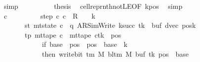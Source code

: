 \begin{isabellebody}
\ simp\isanewline
\ \ \ \ \ \ \ \ \isamarkupfalse%
\ {\isacharquery}{\kern0pt}thesis\ \isamarkupfalse%
\ cell{\isacharunderscore}{\kern0pt}repr{\isacharunderscore}{\kern0pt}nth{\isacharunderscore}{\kern0pt}not{\isacharunderscore}{\kern0pt}LE{}{\isacharbrackleft}{\kern0pt}OF\ kpos{\isacharbrackright}{\kern0pt}\ \isamarkupfalse%
\ simp\isanewline
\ \ \ \ \ \ \isamarkupfalse%
\isanewline
\ \ \ \ \isamarkupfalse%
\isanewline
\ \ \ \ \isamarkupfalse%
\ c{\isacharprime}{\kern0pt}{\isacharprime}{\kern0pt}\ \isanewline
\ \ \ \ \ \ \ \ step{\isacharcolon}{\kern0pt}\ {\isachardoublequoteopen}{\isacharparenleft}{\kern0pt}c{\isacharprime}{\kern0pt}{\isacharcomma}{\kern0pt}\ c{\isacharprime}{\kern0pt}{\isacharprime}{\kern0pt}{\isacharparenright}{\kern0pt}\ {\isasymin}\ {\isacharquery}{\kern0pt}R\ {\isacharcircum}{\kern0pt}{\isacharcircum}{\kern0pt}\ {\isacharparenleft}{\kern0pt}{}\ {\isacharasterisk}{\kern0pt}\ {\isacharquery}{\kern0pt}k{\isacharparenright}{\kern0pt}{\isachardoublequoteclose}\isanewline
\ \ \ \ \ \ \ st{\isacharcolon}{\kern0pt}\ {\isachardoublequoteopen}mt{\isacharunderscore}{\kern0pt}state\ c{\isacharprime}{\kern0pt}{\isacharprime}{\kern0pt}\ {\isacharequal}{\kern0pt}\ {\isacharparenleft}{\kern0pt}q{\isacharcomma}{\kern0pt}\ AR{\isacharunderscore}{\kern0pt}SimWrite{\isacharcomma}{\kern0pt}\ k{\isacharunderscore}{\kern0pt}succ\ tk{\isacharcomma}{\kern0pt}\ {}{\isacharcomma}{\kern0pt}\ buf{\isacharcomma}{\kern0pt}\ dvec{\isacharcomma}{\kern0pt}\ posk{\isacharparenright}{\kern0pt}{\isachardoublequoteclose}\isanewline
\ \ \ \ \ \ \ tp{\isacharcolon}{\kern0pt}\ {\isachardoublequoteopen}mt{\isacharunderscore}{\kern0pt}tape\ c{\isacharprime}{\kern0pt}{\isacharprime}{\kern0pt}\ {\isacharequal}{\kern0pt}\ {\isacharparenleft}{\kern0pt}mt{\isacharunderscore}{\kern0pt}tape\ c{\isacharprime}{\kern0pt}{\isacharparenright}{\kern0pt}{\isacharparenleft}{\kern0pt}tk\ {\isacharcolon}{\kern0pt}{\isacharequal}{\kern0pt}\ {\isacharparenleft}{\kern0pt}{\isasymlambda}pos{\isachardot}{\kern0pt}\isanewline
\ \ \ \ \ \ \ \ \ \ \ \ if\ {\isacharquery}{\kern0pt}base\ {\isasymle}\ pos\ {\isasymand}\ pos\ {\isacharless}{\kern0pt}\ {\isacharquery}{\kern0pt}base\ {\isacharplus}{\kern0pt}\ {\isacharquery}{\kern0pt}k\isanewline
\ \ \ \ \ \ \ \ \ \ \ \ then\ write{\isacharunderscore}{\kern0pt}bit\ {\isacharparenleft}{\kern0pt}{\isasymGamma}{\isacharunderscore}{\kern0pt}tm\ M{\isacharparenright}{\kern0pt}\ {\isacharparenleft}{\kern0pt}bl{\isacharunderscore}{\kern0pt}tm\ M{\isacharparenright}{\kern0pt}\ {\isacharparenleft}{\kern0pt}buf\ tk{\isacharparenright}{\kern0pt}\ {\isacharparenleft}{\kern0pt}pos\ {\isacharminus}{\kern0pt}\ {\isacharquery}{\kern0pt}base{\isacharparenright}{\kern0pt}\isanewline

\end{isabellebody}
